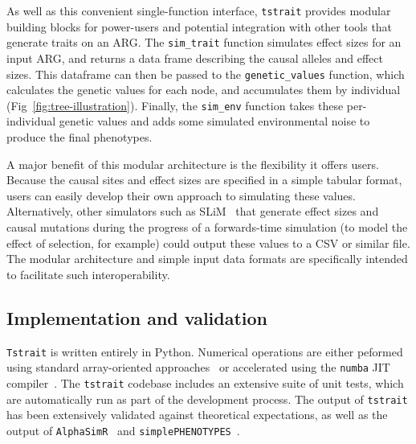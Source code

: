 \documentclass[unnumsec,webpdf,modern,large,namedate]{oup-authoring-template}%
\begin{document}
As well as this convenient single-function interface,
\texttt{tstrait} provides modular building blocks for power-users
and potential integration with other tools that generate
traits on an ARG. The \texttt{sim\_trait} function
simulates effect sizes for an input ARG, and returns a data frame
describing the causal alleles and effect sizes.
This dataframe can then be passed to the \texttt{genetic\_values}
function, which calculates the genetic values for each
node, and accumulates them by individual
(Fig~\ref{fig:tree-illustration}). Finally, the \texttt{sim\_env}
function takes these per-individual genetic values
and adds some simulated environmental noise to produce the final
phenotypes.

A major benefit of this modular architecture is the flexibility it offers
users. Because the causal sites and effect sizes are specified in a
simple tabular format, users can easily develop their own approach
to simulating these values. Alternatively, other simulators
such as SLiM~\citep{haller2023} that generate effect sizes and
causal mutations during the progress of a forwards-time simulation
(to model the effect of selection, for example) could output these
values to a CSV or similar file. The modular architecture  and simple
input data formats are specifically intended to facilitate such
interoperability.

\subsection{Implementation and validation}
\texttt{Tstrait} is written entirely in Python. Numerical operations
are either peformed using standard array-oriented
approaches~\citep{numpy} or accelerated
using the \texttt{numba} JIT compiler~\citep{numba}.
The \texttt{tstrait} codebase includes an extensive suite of unit tests,
which are automatically run as part of the development process. The
output of \texttt{tstrait} has been extensively validated against
theoretical expectations, as well as the output
of \texttt{AlphaSimR}~\citep{gaynor2021} and
\texttt{simplePHENOTYPES}~\citep{fernandes2020}.
\end{document}
